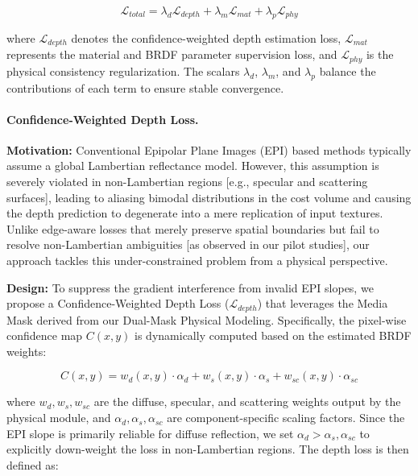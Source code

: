 \begin{equation}
\label{eq:eq46}
\mathcal{L}_{total} = \lambda_{d} \mathcal{L}_{depth} + \lambda_{m} \mathcal{L}_{mat} + \lambda_{p} \mathcal{L}_{phy}
\end{equation}

where $\mathcal{L}_{depth}$ denotes the confidence-weighted depth estimation loss, $\mathcal{L}_{mat}$ represents the material and BRDF parameter supervision loss, and $\mathcal{L}_{phy}$ is the physical consistency regularization. The scalars $\lambda_{d}$, $\lambda_{m}$, and $\lambda_{p}$ balance the contributions of each term to ensure stable convergence.

\paragraph{Confidence-Weighted Depth Loss.}
\textbf{Motivation:} Conventional Epipolar Plane Images (EPI) based methods typically assume a global Lambertian reflectance model. However, this assumption is severely violated in non-Lambertian regions  [e.g., specular and scattering surfaces], leading to aliasing bimodal distributions in the cost volume and causing the depth prediction to degenerate into a mere replication of input textures. Unlike edge-aware losses that merely preserve spatial boundaries but fail to resolve non-Lambertian ambiguities  [as observed in our pilot studies], our approach tackles this under-constrained problem from a physical perspective.

\textbf{Design:} To suppress the gradient interference from invalid EPI slopes, we propose a Confidence-Weighted Depth Loss ($\mathcal{L}_{depth}$) that leverages the Media Mask derived from our Dual-Mask Physical Modeling. Specifically, the pixel-wise confidence map $C(x,y)$ is dynamically computed based on the estimated BRDF weights:

\begin{equation}
\label{eq:eq47}
C(x,y) = w_d(x,y) \cdot \alpha_d + w_s(x,y) \cdot \alpha_s + w_{sc}(x,y) \cdot \alpha_{sc}
\end{equation}

where $w_d, w_s, w_{sc}$ are the diffuse, specular, and scattering weights output by the physical module, and $\alpha_d, \alpha_s, \alpha_{sc}$ are component-specific scaling factors. Since the EPI slope is primarily reliable for diffuse reflection, we set $\alpha_d > \alpha_s, \alpha_{sc}$ to explicitly down-weight the loss in non-Lambertian regions. The depth loss is then defined as:

